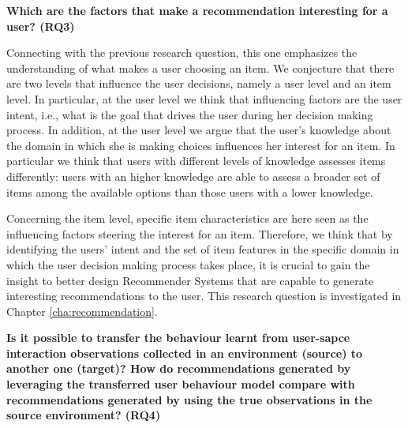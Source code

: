 \noindent \textbf{Which are the factors that make a recommendation interesting for a user? (RQ3)} 

Connecting with the previous research question, this one emphasizes the understanding of what makes a user choosing an item. 
We conjecture that there are two levels that influence the user decisions, namely a user level and an item level.
In particular, at the user level we think that influencing factors are the user intent, i.e., what is the goal that drives the user during her decision making process. In addition, at the user level we argue that the user's knowledge about the domain in which she is making choices influences her interest for an item. In particular we think that users with different levels of knowledge assesses items differently: users with an higher knowledge are able to assess a broader set of items among the available options than those users with a lower knowledge. 

Concerning the item level, specific item characteristics are here seen as the influencing factors steering the interest for an item.
Therefore, we think that by identifying the users' intent and the set of item features in the specific domain in which the user decision making process takes place, it is crucial to gain the insight to better design Recommender Systems that are capable to generate interesting recommendations to the user. This research question is investigated in Chapter \ref{cha:recommendation}. \newline

\noindent \textbf{
Is it possible to transfer the behaviour learnt from user-sapce interaction observations collected in an environment (source) to another one (target)? How do recommendations generated by leveraging the transferred user behaviour model compare with recommendations generated by using the true observations in the source environment? (RQ4)} 


